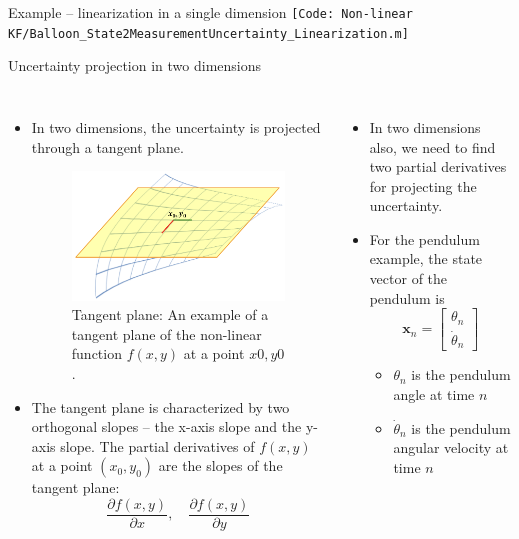 \begin{frame}{Example – linearization in a single dimension}
\texttt{\tiny [Code: Non-linear KF/Balloon\_State2MeasurementUncertainty\_Linearization.m]}

\end{frame}


\begin{frame}{Uncertainty projection in two dimensions}
\begin{columns}
\begin{itemize}
    \item In two dimensions, the uncertainty is projected through a tangent plane.
\begin{figure}
    \centering
    \includegraphics[width=0.95\linewidth]{Figures//Part3/TangentPlane.png}
    \caption{Tangent plane: An example of a tangent plane of the non-linear function $f(x, y)$ at a point $x0, y0$.}
    \label{fig:enter-label}
    \vspace{-10pt}
\end{figure}
\item The tangent plane is characterized by two orthogonal slopes – the x-axis slope and the y-axis slope. The partial derivatives of \( f(x, y) \) at a point \( (x_0, y_0) \) are the slopes of the tangent plane:
\[
\frac{\partial f(x, y)}{\partial x}, \quad \frac{\partial f(x, y)}{\partial y}
\]
\end{itemize}
\begin{itemize}
    \item  In two dimensions also, we need to find two partial derivatives for projecting the uncertainty.
    \item For the pendulum example, the state vector of the pendulum is
    \[
    \mathbf{x}_n =
    \begin{bmatrix}
    \theta_n \\
    \dot{\theta}_n
    \end{bmatrix}
    \]
    \vspace{-8pt}
\begin{itemize}
    \item $\theta_n$ is the pendulum angle at time $n$
    \item $\dot{\theta}_n$ is the pendulum angular velocity at time $n$
\end{itemize}


\end{itemize}
\end{columns}
\end{frame}
